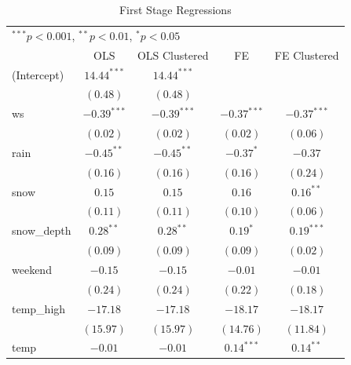\documentclass[12pt,letter paper]{article}
\begin{document}
\bgroup
\def\arraystretch{0.5}
\begin{center}

\begin{longtable}{l c c c c }
\hline

\hline

\hline


\hline

\hline
\multicolumn{5}{l}{\scriptsize{$^{***}p<0.001$, $^{**}p<0.01$, $^*p<0.05$}}\\
\caption{First Stage Regressions}
\label{table:coefficients}
\endlastfoot
 & OLS & OLS Clustered & FE & FE Clustered \\
\hline
(Intercept)             & $14.44^{***}$ & $14.44^{***}$ &               &               \\
                        & $(0.48)$      & $(0.48)$      &               &               \\
ws                      & $-0.39^{***}$ & $-0.39^{***}$ & $-0.37^{***}$ & $-0.37^{***}$ \\
                        & $(0.02)$      & $(0.02)$      & $(0.02)$      & $(0.06)$      \\
rain                    & $-0.45^{**}$  & $-0.45^{**}$  & $-0.37^{*}$   & $-0.37$       \\
                        & $(0.16)$      & $(0.16)$      & $(0.16)$      & $(0.24)$      \\
snow                    & $0.15$        & $0.15$        & $0.16$        & $0.16^{**}$   \\
                        & $(0.11)$      & $(0.11)$      & $(0.10)$      & $(0.06)$      \\
snow\_depth             & $0.28^{**}$   & $0.28^{**}$   & $0.19^{*}$    & $0.19^{***}$  \\
                        & $(0.09)$      & $(0.09)$      & $(0.09)$      & $(0.02)$      \\
weekend                 & $-0.15$       & $-0.15$       & $-0.01$       & $-0.01$       \\
                        & $(0.24)$      & $(0.24)$      & $(0.22)$      & $(0.18)$      \\
temp\_high              & $-17.18$      & $-17.18$      & $-18.17$      & $-18.17$      \\
                        & $(15.97)$     & $(15.97)$     & $(14.76)$     & $(11.84)$     \\
temp                    & $-0.01$       & $-0.01$       & $0.14^{***}$  & $0.14^{**}$   \\

\end{longtable}
\end{center}
\end{document}
